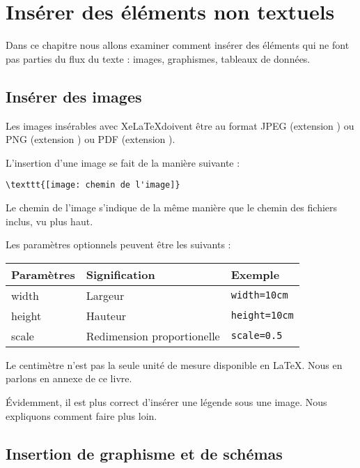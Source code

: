 \chapter{Insérer des éléments non textuels}

\begin{prealable}
	Dans ce chapitre nous allons examiner comment insérer des éléments qui ne font pas parties du flux du texte : images, graphismes, tableaux de données.
\end{prealable}

\section{Insérer des images}

Les images insérables avec Xe\LaTeX doivent être au format JPEG (extension ) ou PNG (extension ) ou PDF (extension ).

L'insertion d'une image se fait de la manière suivante :
\begin{verbatim}
\texttt{[image: chemin de l'image]}
\end{verbatim}

Le chemin de l'image s'indique de la même manière que le chemin des fichiers inclus, vu plus haut.

Les paramètres optionnels peuvent être les suivants :

\begin{longtable}{l||l|l}
	Paramètres & Signification & Exemple	\\
	\hline
	\endhead
	width		& Largeur 	& \verb|width=10cm| 	\\
	height		& Hauteur	& \verb|height=10cm|	 \\
	scale		& Redimension proportionelle & \verb|scale=0.5|\\
	
\end{longtable}

\begin{anedocte}
Le centimètre n'est pas la seule  unité de mesure disponible en \LaTeX. Nous en parlons en annexe de ce livre.
\end{anedocte}

\begin{attention}
	Évidemment, il est plus correct d'insérer une légende sous une image. Nous expliquons comment faire plus loin.
\end{attention}

\section{Insertion de graphisme et de schémas}

